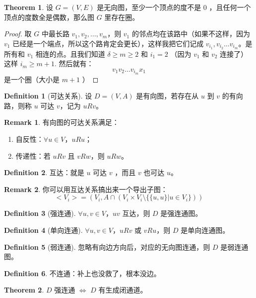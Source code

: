 \documentclass[oneside]{book}
\theoremstyle{definition}
\newtheorem{definition}{Definition}[section]
\newtheorem{theorem}{Theorem}[section]
\newtheorem{remark}{Remark}[section]
\begin{document}
\begin{theorem}
	设 \( G=(V,E) \) 是无向图，至少一个顶点的度不是 0 ，且任何一个顶点的度数全是偶数，那么图 \(G\) 里存在圈。
\end{theorem}

\begin{proof}
	取 \( G \) 中最长路 \( v_1,v_2,\dots,v_m \)，则 \( v_1 \) 的邻点均在该路中（如果不这样，因为 \(v_1\) 已经是一个端点，所以这个路肯定会更长），这样我把它们记成 \(v_{i_1},v_{i_2}\dots v_{i_m}\)。是所有和 \(v_1\) 相连的点。且我们知道 \(\delta\geq m\geq 2\) 和 \(i_1=2\) （因为 \(v_1\) 和 \(v_2\) 连接了）这样 \(i_m\geq m+1\).
	然后就有：
	\[v_1v_2\dots v_{i_m}x_1\]
	是一个圈（大小是 \(m+1\) ）
\end{proof}


\begin{definition}[可达关系]
	设 \( D=(V,A) \) 是有向图，若存在从 \( u \) 到 \( v \) 的有向路，则称 \( u \) 可达 \( v \)，记为 \( u R v \)。
\end{definition}

\begin{remark}
	有向图的可达关系满足：
	\begin{enumerate}
		\item 自反性：\( \forall u \in V \)，\( u R u \)；
		\item 传递性：若 \( u R v \) 且 \( v R w \)，则 \( u R w \)。
	\end{enumerate}
\end{remark}
\begin{definition}
	互达：就是 \(u\) 可达 \(v\) ，而且 \(v\) 也可达 \(u\)。
\end{definition}
\begin{remark}
	你可以用互达关系搞出来一个导出子图：
	\[<V_i>=(V_i,A\cap (V_i\times V_i\setminus \{\{u,u\}|u\in V_i\}))\]
\end{remark}
\begin{definition}[强连通]
	\( \forall u,v \in V \)，\( u v   \) 互达，则 \( D \) 是强连通图。
\end{definition}

\begin{definition}[单向连通]
	\( \forall u,v \in V \)，\( u R v \) 或 \( v R u \)，则 \( D \) 是单向连通图。
\end{definition}

\begin{definition}[弱连通]
	忽略有向边方向后，对应的无向图连通，则 \( D \) 是弱连通图。
\end{definition}
\begin{definition}
	不连通：补上也没救了，根本没边。
\end{definition}
\begin{theorem}
	\( D \) 强连通 \( \iff \)  \(  D \) 有生成闭通道。
\end{theorem}
\end{document}

